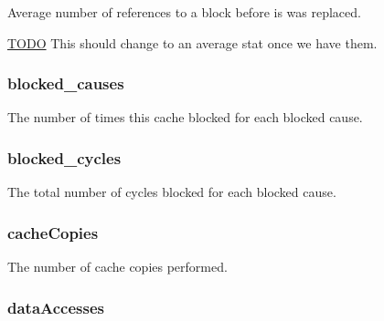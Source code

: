 \label{group__CacheStatistics_gadbcb32891448d652807958d7d79cac39}
Average number of references to a block before is was replaced. \begin{Desc}
\item[\hyperlink{todo__todo000079}{TODO}]This should change to an average stat once we have them. \end{Desc}
\hypertarget{group__CacheStatistics_ga7868c651a1ef44806d546d9a018835cc}{
\subsubsection[{blocked\_\-causes}]{ blocked\_\-causes}}
\label{group__CacheStatistics_ga7868c651a1ef44806d546d9a018835cc}
The number of times this cache blocked for each blocked cause. \hypertarget{group__CacheStatistics_ga4acd5af734aeaacf375fb724164623a2}{
\subsubsection[{blocked\_\-cycles}]{ blocked\_\-cycles}}
\label{group__CacheStatistics_ga4acd5af734aeaacf375fb724164623a2}
The total number of cycles blocked for each blocked cause. \hypertarget{group__CacheStatistics_ga733d9eeafaa8c6f179cf5ed460e36ce0}{
\subsubsection[{cacheCopies}]{ cacheCopies}}
\label{group__CacheStatistics_ga733d9eeafaa8c6f179cf5ed460e36ce0}
The number of cache copies performed. \hypertarget{group__CacheStatistics_gad8dad26f755f9db669fc2b8dab657c0a}{
\subsubsection[{dataAccesses}]{ dataAccesses}}
